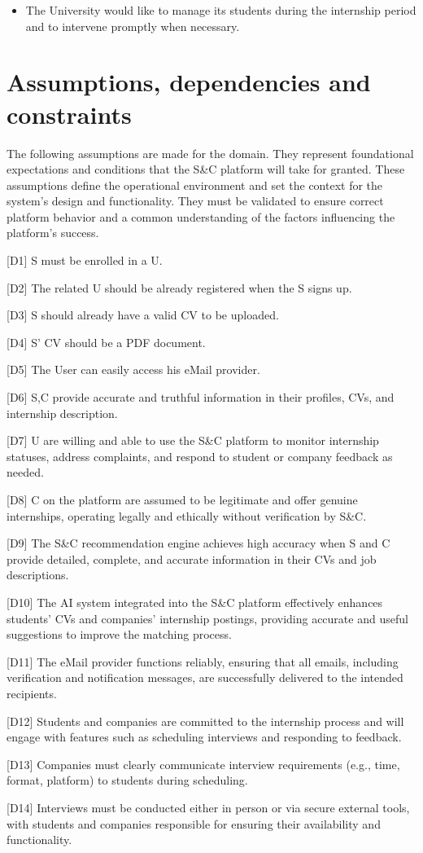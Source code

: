 \begin{itemize}
\item
  The University would like to manage its students during the internship
  period and to intervene promptly when necessary.
\end{itemize}


\section{Assumptions, dependencies and constraints}
\label{sec:assumptions_dependencies_constraints}%

The following assumptions are made for the domain. They represent
foundational expectations and conditions that the S\&C platform will
take for granted. These assumptions define the operational environment
and set the context for the system's design and functionality. They must
be validated to ensure correct platform behavior and a common
understanding of the factors influencing the platform's success.

{[}D1{]} S must be enrolled in a U.

{[}D2{]} The related U should be already registered when the S signs up.

{[}D3{]} S should already have a valid CV to be uploaded.

{[}D4{]} S' CV should be a PDF document.

{[}D5{]} The User can easily access his eMail provider.

{[}D6{]} S,C provide accurate and truthful information in their
profiles, CVs, and internship description.

{[}D7{]} U are willing and able to use the S\&C platform to monitor
internship statuses, address complaints, and respond to student or
company feedback as needed.

{[}D8{]} C on the platform are assumed to be legitimate and offer
genuine internships, operating legally and ethically without
verification by S\&C.

{[}D9{]} The S\&C recommendation engine achieves high accuracy when S
and C provide detailed, complete, and accurate information in their CVs
and job descriptions.

{[}D10{]} The AI system integrated into the S\&C platform effectively
enhances students' CVs and companies' internship postings, 
providing accurate and useful suggestions to improve the matching process.

{[}D11{]} The eMail provider functions reliably, ensuring that all
emails, including verification and notification messages, are
successfully delivered to the intended recipients.

{[}D12{]} Students and companies are committed to the internship process
and will engage with features such as scheduling interviews and
responding to feedback.

{[}D13{]} Companies must clearly communicate interview requirements
(e.g., time, format, platform) to students during scheduling.

{[}D14{]} Interviews must be conducted either in person or via secure
external tools, with students and companies responsible for ensuring
their availability and functionality.